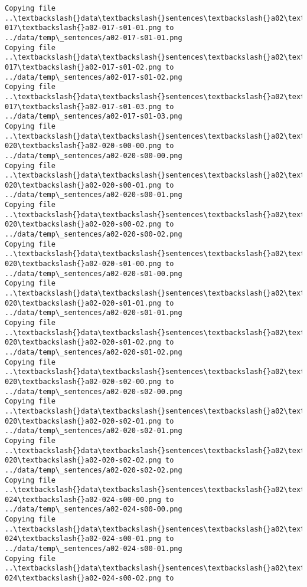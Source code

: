 \documentclass[11pt]{article}
\begin{document}
\begin{Verbatim}[commandchars=\\\{\}]
Copying file ..\textbackslash{}data\textbackslash{}sentences\textbackslash{}a02\textbackslash{}a02-017\textbackslash{}a02-017-s01-01.png to
../data/temp\_sentences/a02-017-s01-01.png
Copying file ..\textbackslash{}data\textbackslash{}sentences\textbackslash{}a02\textbackslash{}a02-017\textbackslash{}a02-017-s01-02.png to
../data/temp\_sentences/a02-017-s01-02.png
Copying file ..\textbackslash{}data\textbackslash{}sentences\textbackslash{}a02\textbackslash{}a02-017\textbackslash{}a02-017-s01-03.png to
../data/temp\_sentences/a02-017-s01-03.png
Copying file ..\textbackslash{}data\textbackslash{}sentences\textbackslash{}a02\textbackslash{}a02-020\textbackslash{}a02-020-s00-00.png to
../data/temp\_sentences/a02-020-s00-00.png
Copying file ..\textbackslash{}data\textbackslash{}sentences\textbackslash{}a02\textbackslash{}a02-020\textbackslash{}a02-020-s00-01.png to
../data/temp\_sentences/a02-020-s00-01.png
Copying file ..\textbackslash{}data\textbackslash{}sentences\textbackslash{}a02\textbackslash{}a02-020\textbackslash{}a02-020-s00-02.png to
../data/temp\_sentences/a02-020-s00-02.png
Copying file ..\textbackslash{}data\textbackslash{}sentences\textbackslash{}a02\textbackslash{}a02-020\textbackslash{}a02-020-s01-00.png to
../data/temp\_sentences/a02-020-s01-00.png
Copying file ..\textbackslash{}data\textbackslash{}sentences\textbackslash{}a02\textbackslash{}a02-020\textbackslash{}a02-020-s01-01.png to
../data/temp\_sentences/a02-020-s01-01.png
Copying file ..\textbackslash{}data\textbackslash{}sentences\textbackslash{}a02\textbackslash{}a02-020\textbackslash{}a02-020-s01-02.png to
../data/temp\_sentences/a02-020-s01-02.png
Copying file ..\textbackslash{}data\textbackslash{}sentences\textbackslash{}a02\textbackslash{}a02-020\textbackslash{}a02-020-s02-00.png to
../data/temp\_sentences/a02-020-s02-00.png
Copying file ..\textbackslash{}data\textbackslash{}sentences\textbackslash{}a02\textbackslash{}a02-020\textbackslash{}a02-020-s02-01.png to
../data/temp\_sentences/a02-020-s02-01.png
Copying file ..\textbackslash{}data\textbackslash{}sentences\textbackslash{}a02\textbackslash{}a02-020\textbackslash{}a02-020-s02-02.png to
../data/temp\_sentences/a02-020-s02-02.png
Copying file ..\textbackslash{}data\textbackslash{}sentences\textbackslash{}a02\textbackslash{}a02-024\textbackslash{}a02-024-s00-00.png to
../data/temp\_sentences/a02-024-s00-00.png
Copying file ..\textbackslash{}data\textbackslash{}sentences\textbackslash{}a02\textbackslash{}a02-024\textbackslash{}a02-024-s00-01.png to
../data/temp\_sentences/a02-024-s00-01.png
Copying file ..\textbackslash{}data\textbackslash{}sentences\textbackslash{}a02\textbackslash{}a02-024\textbackslash{}a02-024-s00-02.png to

\end{Verbatim}
\end{document}
